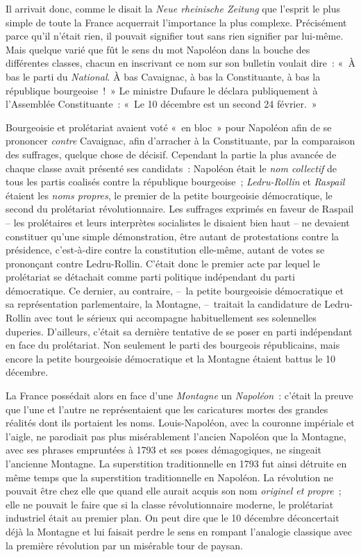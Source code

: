 \documentclass[french,twoside]{book} %
\begin{document}
Il arrivait donc, comme le disait la \emph{Neue rheinische Zeitung} que l’esprit le plus simple de toute la France acquerrait l’importance la plus complexe. Précisément parce qu’il n’était rien, il pouvait signifier tout sans rien signifier par lui-même. Mais quelque varié que fût le sens du mot Napoléon dans la bouche des différentes classes, chacun en inscrivant ce nom sur son bulletin voulait dire : « À bas le parti du \emph{National}. À bas Cavaignac, à bas la Constituante, à bas la république bourgeoise ! » Le ministre Dufaure le déclara publiquement à l’Assemblée Constituante : « Le 10 décembre est un second 24 février. »\par
Bourgeoisie et prolétariat avaient voté « en bloc » pour Napoléon afin de se prononcer \emph{contre} Cavaignac, afin d’arracher à la Constituante, par la comparaison des suffrages, quelque chose de décisif. Cependant la partie la plus avancée de chaque classe avait présenté ses candidats : Napoléon était le \emph{nom collectif} de tous les partis coalisés contre la république bourgeoise ; \emph{Ledru-Rollin} et \emph{Raspail} étaient les \emph{noms propres}, le premier de la petite bourgeoisie démocratique, le second du prolétariat révolutionnaire. Les suffrages exprimés en faveur de Raspail – les prolétaires et leurs interprètes socialistes le disaient bien haut – ne devaient constituer qu’une simple démonstration, être autant de protestations contre la présidence, c’est-à-dire contre la constitution elle-même, autant de votes se prononçant contre Ledru-Rollin. C’était donc le premier acte par lequel le prolétariat se détachait comme parti politique indépendant du parti démocratique. Ce dernier, au contraire, – la petite bourgeoisie démocratique et sa représentation parlementaire, la Montagne, – traitait la candidature de Ledru-Rollin avec tout le sérieux qui accompagne habituellement ses solennelles duperies. D’ailleurs, c’était sa dernière tentative de se poser en parti indépendant en face du prolétariat. Non seulement le parti des bourgeois républicains, mais encore la petite bourgeoisie démocratique et la Montagne étaient battus le 10 décembre.\par
La France possédait alors en face d’une \emph{Montagne} un \emph{Napoléon} : c’était la preuve que l’une et l’autre ne représentaient que les caricatures mortes des grandes réalités dont ils portaient les noms. Louis-Napoléon, avec la couronne impériale et l’aigle, ne parodiait pas plus misérablement l’ancien Napoléon que la Montagne, avec ses phrases empruntées à 1793 et ses poses démagogiques, ne singeait l’ancienne Montagne. La superstition traditionnelle en 1793 fut ainsi détruite en même temps que la superstition traditionnelle en Napoléon. La révolution ne pouvait être chez elle que quand elle aurait acquis son nom \emph{originel et propre} ; elle ne pouvait le faire que si la classe révolutionnaire moderne, le prolétariat industriel était au premier plan. On peut dire que le 10 décembre déconcertait déjà la Montagne et lui faisait perdre le sens en rompant l’analogie classique avec la première révolution par un misérable tour de paysan.\par
\end{document}
